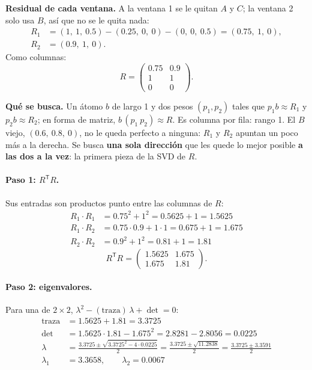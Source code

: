 \documentclass[11pt,letterpaper]{article}
\newcommand{\T}{^{\mathsf{T}}}
\newcommand{\raiz}[1]{\sqrt{#1}}
\begin{document}
\textbf{Residual de cada ventana.} A la ventana 1 se le quitan $A$ y
$C$; la ventana 2 solo usa $B$, así que no se le quita nada:
\begin{align*}
    R_1 &= (1,\ 1,\ 0.5) - (0.25,\ 0,\ 0) - (0,\ 0,\ 0.5)
         = (0.75,\ 1,\ 0), \\
    R_2 &= (0.9,\ 1,\ 0) .
\end{align*}
Como columnas:
\[
    R = \begin{pmatrix} 0.75 & 0.9 \\ 1 & 1 \\ 0 & 0 \end{pmatrix} .
\]

\textbf{Qué se busca.} Un átomo $b$ de largo 1 y dos pesos $(p_1, p_2)$
tales que $p_1 b \approx R_1$ y $p_2 b \approx R_2$; en forma de
matriz, $b\,(p_1\ p_2) \approx R$. Es columna por fila: rango 1. El $B$
viejo, $(0.6,\ 0.8,\ 0)$, no le queda perfecto a ninguna: $R_1$ y $R_2$
apuntan un poco más a la derecha. Se busca \textbf{una sola dirección}
que les quede lo mejor posible \textbf{a las dos a la vez}: la primera
pieza de la SVD de $R$.

\paragraph{Paso 1: $R\T R$.} Sus entradas son productos punto entre
las columnas de $R$:
\begin{align*}
    R_1 \cdot R_1 &= 0.75^2 + 1^2 = 0.5625 + 1 = 1.5625 \\
    R_1 \cdot R_2 &= 0.75 \cdot 0.9 + 1 \cdot 1 = 0.675 + 1 = 1.675 \\
    R_2 \cdot R_2 &= 0.9^2 + 1^2 = 0.81 + 1 = 1.81
\end{align*}
\[
    R\T R = \begin{pmatrix} 1.5625 & 1.675 \\ 1.675 & 1.81
            \end{pmatrix} .
\]

\paragraph{Paso 2: eigenvalores.} Para una de $2 \times 2$,
$\lambda^2 - (\text{traza})\,\lambda + \det = 0$:
\begin{align*}
    \text{traza} &= 1.5625 + 1.81 = 3.3725 \\
    \det &= 1.5625 \cdot 1.81 - 1.675^2 = 2.8281 - 2.8056 = 0.0225 \\
    \lambda &= \frac{3.3725 \pm \raiz{3.3725^2 - 4 \cdot 0.0225}}{2}
             = \frac{3.3725 \pm \raiz{11.2838}}{2}
             = \frac{3.3725 \pm 3.3591}{2} \\
    \lambda_1 &= 3.3658, \qquad \lambda_2 = 0.0067
\end{align*}
\end{document}
